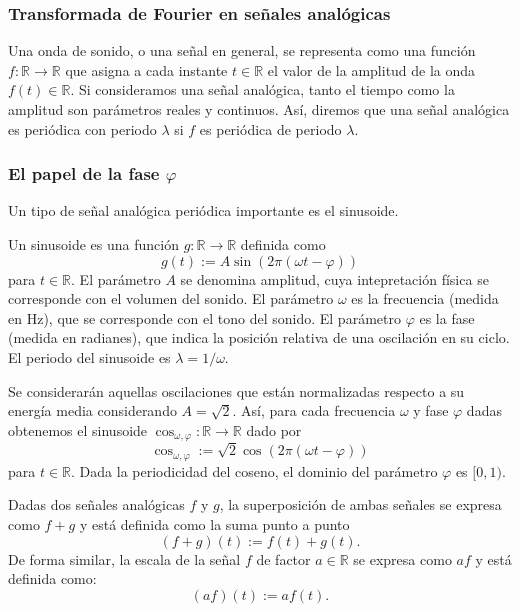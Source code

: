 \documentclass{article}
\begin{document}
\subsubsection{Transformada de Fourier en señales analógicas}

Una onda de sonido, o una señal en general, se representa como una función $f:\mathbb{R\rightarrow R} $ que asigna a cada instante $t\in\mathbb{R}$ el valor de la amplitud de la onda $f(t)\in\mathbb{R}$. Si consideramos una señal analógica, tanto el tiempo como la amplitud son parámetros reales y continuos. Así, diremos que una señal analógica es periódica con periodo $\lambda$ si $f$ es periódica de periodo $\lambda$.

\subsubsection{El papel de la fase $\varphi$}

Un tipo de señal analógica periódica importante es el sinusoide.
\begin{definition}
    Un sinusoide es una función $g:\mathbb{R\rightarrow R} $ definida como
        \begin{equation}\label{eq:Asinusoid}
            g(t):=A \sin(2\pi(\omega t-\varphi))
        \end{equation}
    para $t\in\mathbb{R}$. El parámetro $A$ se denomina amplitud, cuya intepretación física se corresponde con el volumen del sonido. El parámetro $\omega$ es la frecuencia (medida en Hz), que se corresponde con el tono del sonido. El parámetro $\varphi$ es la fase (medida en radianes), que indica la posición relativa de una oscilación en su ciclo. El periodo del sinusoide es $\lambda=1/\omega$.
\end{definition}

 Se considerarán aquellas oscilaciones que están normalizadas respecto a su energía media considerando $A=\sqrt{2}$. Así, para cada frecuencia $\omega$ y fase $\varphi$ dadas  obtenemos el sinusoide $\cos_{\omega,\varphi}:\mathbb{R\rightarrow R}$ dado por
\begin{equation}\label{eq:sinusoid}
\cos_{\omega,\varphi}:=\sqrt{2}\cos(2\pi(\omega t-\varphi))
\end{equation}
para $t\in\mathbb{R}$. Dada la periodicidad del coseno, el dominio del parámetro $\varphi$ es $[0,1)$. 
\begin{definition}
    Dadas dos señales analógicas $f$ y $g$, la superposición de ambas señales se expresa como $f+g$ y está definida como la suma punto a punto
    \begin{equation}
        (f+g)(t):=f(t)+g(t).
    \end{equation}
    De forma similar, la escala de la señal $f$ de factor $a\in\mathbb{R}$ se expresa como $af$ y está definida como:
    \begin{equation}
        (af)(t):=af(t).
    \end{equation}
\end{definition}
\end{document}
